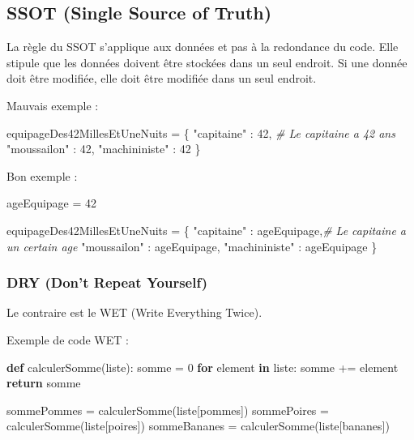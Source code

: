 \documentclass[11pt]{article}
\newenvironment{Shaded}{}{}
\newcommand{\KeywordTok}[1]{\textcolor[rgb]{0.00,0.44,0.13}{\textbf{{#1}}}}
\newcommand{\DecValTok}[1]{\textcolor[rgb]{0.25,0.63,0.44}{{#1}}}
\newcommand{\StringTok}[1]{\textcolor[rgb]{0.25,0.44,0.63}{{#1}}}
\newcommand{\CommentTok}[1]{\textcolor[rgb]{0.38,0.63,0.69}{\textit{{#1}}}}
\newcommand{\NormalTok}[1]{{#1}}
\newcommand{\ControlFlowTok}[1]{\textcolor[rgb]{0.00,0.44,0.13}{\textbf{{#1}}}}
\newcommand{\OperatorTok}[1]{\textcolor[rgb]{0.40,0.40,0.40}{{#1}}}
\begin{document}
\hypertarget{ssot-single-source-of-truth}{%
\subsection{SSOT (Single Source of
Truth)}\label{ssot-single-source-of-truth}}

La règle du SSOT s'applique aux données et pas à la redondance du code.
Elle stipule que les données doivent être stockées dans un seul endroit.
Si une donnée doit être modifiée, elle doit être modifiée dans un seul
endroit.

Mauvais exemple :

\begin{Shaded}
\begin{Highlighting}[]
\NormalTok{equipageDes42MillesEtUneNuits }\OperatorTok{=}\NormalTok{ \{}
\StringTok{"capitaine"}\NormalTok{ : }\DecValTok{42}\NormalTok{, }\CommentTok{# Le capitaine a 42 ans}
\StringTok{"moussailon"}\NormalTok{ : }\DecValTok{42}\NormalTok{,}
\StringTok{"machininiste"}\NormalTok{ : }\DecValTok{42}
\NormalTok{\}}
\end{Highlighting}
\end{Shaded}

Bon exemple :

\begin{Shaded}
\begin{Highlighting}[]
\NormalTok{ageEquipage }\OperatorTok{=} \DecValTok{42}

\NormalTok{equipageDes42MillesEtUneNuits }\OperatorTok{=}\NormalTok{ \{}
\StringTok{"capitaine"}\NormalTok{ : ageEquipage,}\CommentTok{# Le capitaine a un certain age}
\StringTok{"moussailon"}\NormalTok{ : ageEquipage,}
\StringTok{"machininiste"}\NormalTok{ : ageEquipage}
\NormalTok{\}}
\end{Highlighting}
\end{Shaded}

\hypertarget{dry-dont-repeat-yourself}{%
\subsubsection{DRY (Don't Repeat
Yourself)}\label{dry-dont-repeat-yourself}}

Le contraire est le WET (Write Everything Twice).

Exemple de code WET :

\begin{Shaded}
\begin{Highlighting}[]
\KeywordTok{def}\NormalTok{ calculerSomme(liste):}
\NormalTok{    somme }\OperatorTok{=} \DecValTok{0}
    \ControlFlowTok{for}\NormalTok{ element }\KeywordTok{in}\NormalTok{ liste:}
\NormalTok{        somme }\OperatorTok{+=}\NormalTok{ element}
    \ControlFlowTok{return}\NormalTok{ somme}

\NormalTok{sommePommes }\OperatorTok{=}\NormalTok{ calculerSomme(liste[pommes])}
\NormalTok{sommePoires }\OperatorTok{=}\NormalTok{ calculerSomme(liste[poires])}
\NormalTok{sommeBananes }\OperatorTok{=}\NormalTok{ calculerSomme(liste[bananes])}
\end{Highlighting}
\end{Shaded}
\end{document}
